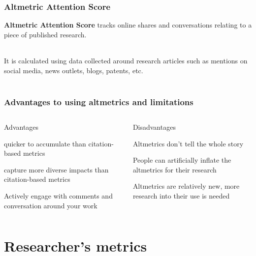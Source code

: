 \documentclass{beamer}
\begin{document}
\begin{frame}
    \frametitle{Altmetric Attention Score}

    \textbf{Altmetric Attention Score} tracks online shares and conversations relating to a piece of published research. \\~\

     It is calculated using data collected around research articles such as mentions on social media, news outlets, blogs, patents, etc.\\~\

\end{frame}
\begin{frame}
    \frametitle{Advantages to using altmetrics and limitations}
    \begin{columns}[T]
        \begin{column}{.5\textwidth} \pause
            \centering Advantages 
            \begin{propslist}
                \item quicker to accumulate than citation-based metrics  \pause
                \item capture more diverse impacts than citation-based metrics \pause              
                \item Actively engage with comments and conversation around your work \pause
            \end{propslist}
        \end{column}
        \begin{column}{.5\textwidth}
            \centering Disadvantages %
            \begin{conslist}
                \item Altmetrics don’t tell the whole story \pause
                \item People can artificially inflate the altmetrics for their research \pause
                \item Altmetrics are relatively new, more research into their use is needed  \pause
            \end{conslist}
        \end{column}
    \end{columns}
\end{frame}

\section{Researcher's metrics}
\end{document}
